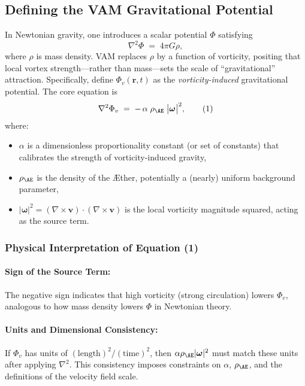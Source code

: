 \documentclass[aps,preprint,superscriptaddress]{revtex4-2}
\begin{document}
    \subsection{Defining the VAM Gravitational Potential}
    In Newtonian gravity, one introduces a scalar potential \(\Phi\) satisfying
    \[
        \nabla^2 \Phi \;=\; 4 \pi G \rho,
    \]
    where \(\rho\) is mass density. VAM replaces \(\rho\) by a function of vorticity, positing that local vortex strength—rather than mass—sets the scale of “gravitational” attraction. Specifically, define \(\Phi_v(\mathbf{r},t)\) as the \textit{vorticity-induced} gravitational potential. The core equation is
    \[
        \nabla^2 \Phi_v \;=\; -\,\alpha \;\rho_{\mathrm{\AE}}\;\bigl|\boldsymbol{\omega}\bigr|^2,
        \tag{1}
    \]
    where:
    \begin{itemize}
        \item \(\alpha\) is a dimensionless proportionality constant (or set of constants) that calibrates the strength of vorticity-induced gravity,
        \item \(\rho_{\mathrm{\AE}}\) is the density of the Æther, potentially a (nearly) uniform background parameter,
        \item \(\lvert \boldsymbol{\omega} \rvert^2 = (\nabla \times \mathbf{v})\cdot(\nabla \times \mathbf{v})\) is the local vorticity magnitude squared, acting as the source term.
    \end{itemize}

    \subsubsection{Physical Interpretation of Equation (1)}

    \paragraph{Sign of the Source Term:} The negative sign indicates that high vorticity (strong circulation) lowers \(\Phi_v\), analogous to how mass density lowers \(\Phi\) in Newtonian theory.

    \paragraph{Units and Dimensional Consistency:} If \(\Phi_v\) has units of \((\text{length})^2/(\text{time})^2\), then \(\alpha \rho_{\mathrm{\AE}} \lvert \boldsymbol{\omega} \rvert^2\) must match these units after applying \(\nabla^2\). This consistency imposes constraints on \(\alpha\), \(\rho_{\mathrm{\AE}}\), and the definitions of the velocity field scale.
\end{document}
